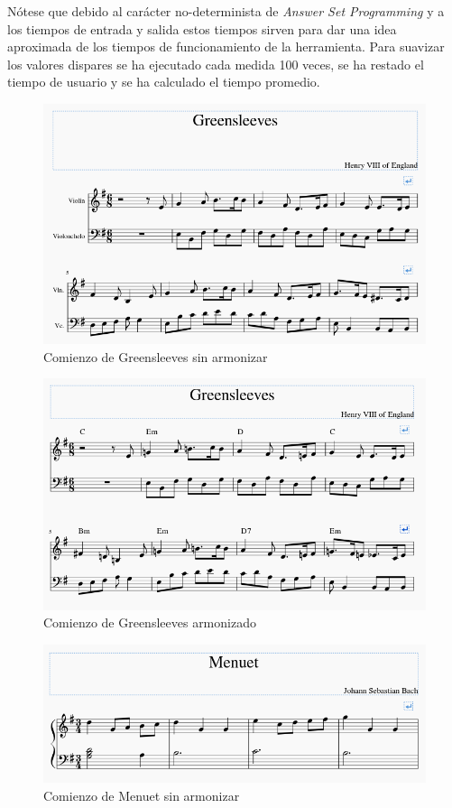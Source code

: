  Nótese que debido al carácter no-determinista de \textit{Answer Set Programming} y a los tiempos de entrada y salida estos tiempos sirven para dar una idea aproximada de los tiempos de funcionamiento de la herramienta. Para suavizar los valores dispares se ha ejecutado cada medida 100 veces, se ha restado el tiempo de usuario y se ha calculado el tiempo promedio. 
 
 \begin{figure}
 	\centering
 	\includegraphics[width=0.8\linewidth]{imagenes/evaluation/greensleeves_orig.png}
 	\caption{Comienzo de Greensleeves sin armonizar}
 	\label{fig:greensleeves_orig}
 \end{figure}
 
  \begin{figure}
  	\centering
  	\includegraphics[width=0.8\linewidth]{imagenes/evaluation/greensleeves_harm.png}
  	\caption{Comienzo de Greensleeves armonizado}
  	\label{fig:greensleeves_harm}
  \end{figure}
  
   \begin{figure}
   	\centering
   	\includegraphics[width=0.8\linewidth]{imagenes/evaluation/menuet_orig.png}
   	\caption{Comienzo de Menuet sin armonizar}
   	\label{fig:menuet_orig}
   \end{figure}
   

